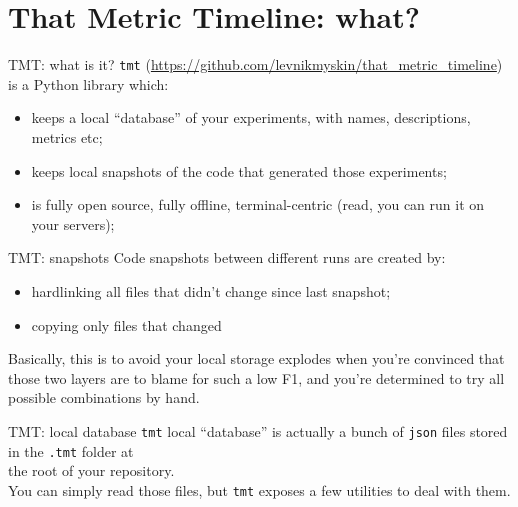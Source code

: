 \documentclass[aspectratio=169,xcolor={dvipsnames}]{beamer}
\begin{document}
  \section{That Metric Timeline: what?}
  \begin{frame}{TMT: what is it?}
    \texttt{tmt} (\url{https://github.com/levnikmyskin/that_metric_timeline}) is a Python library which:
    \begin{itemize}
      \item keeps a local ``database'' of your experiments, with names, descriptions, metrics etc;
      \item keeps local snapshots of the code that generated those experiments;
      \item is fully open source, fully offline, terminal-centric (read, you can run it on your servers);
    \end{itemize}
  \end{frame}
  \begin{frame}{TMT: snapshots}
    Code snapshots between different runs are created by:
    \begin{itemize}
      \item hardlinking all files that didn't change since last snapshot;
      \item copying only files that changed
    \end{itemize}
    Basically, this is to avoid your local storage explodes when you're convinced that
    \\those two layers are to blame for such a low F1, and you're determined to try all possible
    combinations by hand.
  \end{frame}
  \begin{frame}{TMT: local database}
    \texttt{tmt} local ``database'' is actually a bunch of \texttt{json} files stored
    in the \texttt{.tmt} folder at\\the root of your repository.\\
    You can simply read those files, but \texttt{tmt} exposes a few utilities to deal with them.
  \end{frame}
\end{document}
